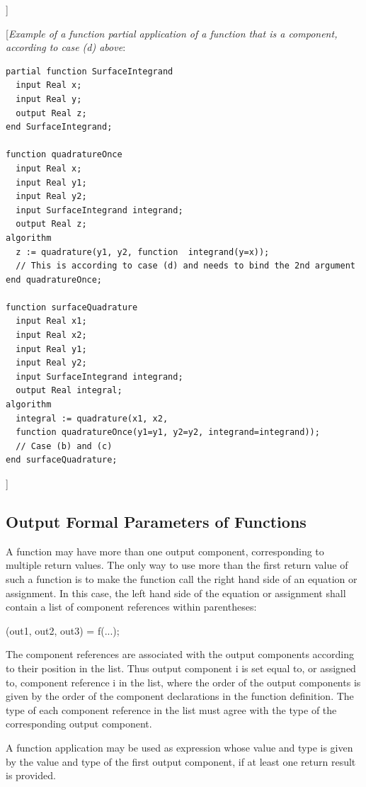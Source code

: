\documentclass[10pt,a4paper]{report}
\def\doublelabel#1{\label{#1}}
\begin{document}
{]}

{[}\emph{Example of a function partial application of a function that is
a component, according to case (d) above}:

\begin{lstlisting}[language=modelica]
partial function SurfaceIntegrand
  input Real x;
  input Real y;
  output Real z;
end SurfaceIntegrand;

function quadratureOnce
  input Real x;
  input Real y1;
  input Real y2;
  input SurfaceIntegrand integrand;
  output Real z;
algorithm
  z := quadrature(y1, y2, function  integrand(y=x));
  // This is according to case (d) and needs to bind the 2nd argument
end quadratureOnce;

function surfaceQuadrature
  input Real x1;
  input Real x2;
  input Real y1;
  input Real y2;
  input SurfaceIntegrand integrand;
  output Real integral;
algorithm
  integral := quadrature(x1, x2,
  function quadratureOnce(y1=y1, y2=y2, integrand=integrand));
  // Case (b) and (c)
end surfaceQuadrature;
\end{lstlisting}
{]}

\subsection{Output Formal Parameters of Functions}\doublelabel{output-formal-parameters-of-functions}

A function may have more than one output component, corresponding to
multiple return values. The only way to use more than the first return
value of such a function is to make the function call the right hand
side of an equation or assignment. In this case, the left hand side of
the equation or assignment shall contain a list of component references
within parentheses:

(out1, out2, out3) = f(...);

The component references are associated with the output components
according to their position in the list. Thus output component i is set
equal to, or assigned to, component reference i in the list, where the
order of the output components is given by the order of the component
declarations in the function definition. The type of each component
reference in the list must agree with the type of the corresponding
output component.

A function application may be used as expression whose value and type is
given by the value and type of the first output component, if at least
one return result is provided.
\end{document}
